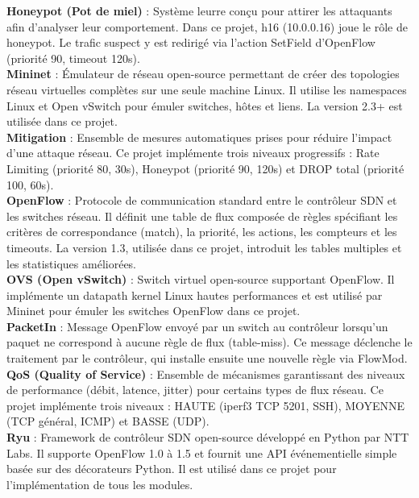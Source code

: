 \documentclass[12pt,a4paper]{report}
\begin{document}
\textbf{Honeypot (Pot de miel)} : Système leurre conçu
pour attirer les attaquants afin d'analyser leur
comportement. Dans ce projet, h16 (10.0.0.16) joue le
rôle de honeypot. Le trafic suspect y est redirigé via
l'action SetField d'OpenFlow (priorité 90, timeout 120s).\\[0.3cm]

\textbf{Mininet} : Émulateur de réseau open-source
permettant de créer des topologies réseau virtuelles
complètes sur une seule machine Linux. Il utilise les
namespaces Linux et Open vSwitch pour émuler switches,
hôtes et liens. La version 2.3+ est utilisée dans
ce projet.\\[0.3cm]

\textbf{Mitigation} : Ensemble de mesures automatiques
prises pour réduire l'impact d'une attaque réseau. Ce
projet implémente trois niveaux progressifs : Rate
Limiting (priorité 80, 30s), Honeypot (priorité 90,
120s) et DROP total (priorité 100, 60s).\\[0.3cm]

\textbf{OpenFlow} : Protocole de communication standard
entre le contrôleur SDN et les switches réseau. Il définit
une table de flux composée de règles spécifiant les
critères de correspondance (match), la priorité, les
actions, les compteurs et les timeouts. La version 1.3,
utilisée dans ce projet, introduit les tables multiples
et les statistiques améliorées.\\[0.3cm]

\textbf{OVS (Open vSwitch)} : Switch virtuel open-source
supportant OpenFlow. Il implémente un datapath kernel
Linux hautes performances et est utilisé par Mininet
pour émuler les switches OpenFlow dans ce projet.\\[0.3cm]

\textbf{PacketIn} : Message OpenFlow envoyé par un switch
au contrôleur lorsqu'un paquet ne correspond à aucune
règle de flux (table-miss). Ce message déclenche le
traitement par le contrôleur, qui installe ensuite une
nouvelle règle via FlowMod.\\[0.3cm]

\textbf{QoS (Quality of Service)} : Ensemble de mécanismes
garantissant des niveaux de performance (débit, latence,
jitter) pour certains types de flux réseau. Ce projet
implémente trois niveaux : HAUTE (iperf3 TCP 5201, SSH),
MOYENNE (TCP général, ICMP) et BASSE (UDP).\\[0.3cm]

\textbf{Ryu} : Framework de contrôleur SDN open-source
développé en Python par NTT Labs. Il supporte OpenFlow
1.0 à 1.5 et fournit une API événementielle simple basée
sur des décorateurs Python. Il est utilisé dans ce projet
pour l'implémentation de tous les modules.\\[0.3cm]
\end{document}
